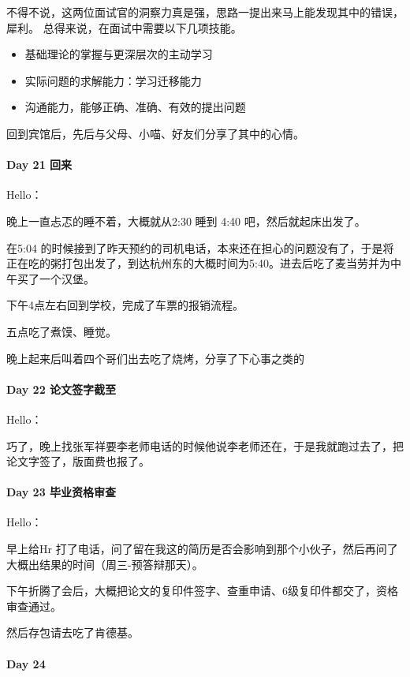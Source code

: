 \documentclass[UTF8,a4paper,8pt]{ctexart}
\begin{document}
		 
		 不得不说，这两位面试官的洞察力真是强，思路一提出来马上能发现其中的错误，犀利。
		 总得来说，在面试中需要以下几项技能。
			 \begin{itemize}
			 	\item 基础理论的掌握与更深层次的主动学习
			 	\item 实际问题的求解能力：学习迁移能力
			 	\item 沟通能力，能够正确、准确、有效的提出问题
			 \end{itemize}

		回到宾馆后，先后与父母、小喵、好友们分享了其中的心情。
 	 \paragraph{Day 21  回来    \quad     }
	 	 Hello：
	 	 
	 	 晚上一直忐忑的睡不着，大概就从2:30 睡到 4:40 吧，然后就起床出发了。
	 	 
	 	 在5:04 的时候接到了昨天预约的司机电话，本来还在担心的问题没有了，于是将正在吃的粥打包出发了，到达杭州东的大概时间为5:40。进去后吃了麦当劳并为中午买了一个汉堡。
	 	 
	 	 下午4点左右回到学校，完成了车票的报销流程。
	 	 
	 	 五点吃了煮馍、睡觉。
	 	 
	 	 晚上起来后叫着四个哥们出去吃了烧烤，分享了下心事之类的
 	 \paragraph{Day 22  论文签字截至   \quad     }
	 	 Hello：
	 	 
	 	 巧了，晚上找张军祥要李老师电话的时候他说李老师还在，于是我就跑过去了，把论文字签了，版面费也报了。
	 	 
	 	 
 	 \paragraph{Day 23  毕业资格审查   \quad     }
	 	 Hello：
	 	 
	 	 早上给Hr 打了电话，问了留在我这的简历是否会影响到那个小伙子，然后再问了大概出结果的时间（周三-预答辩那天）。
	 	 
	 	 下午折腾了会后，大概把论文的复印件签字、查重申请、6级复印件都交了，资格审查通过。
	 	 
	 	 然后存包请去吃了肯德基。
 	 \paragraph{Day 24      \quad     }
\end{document}
